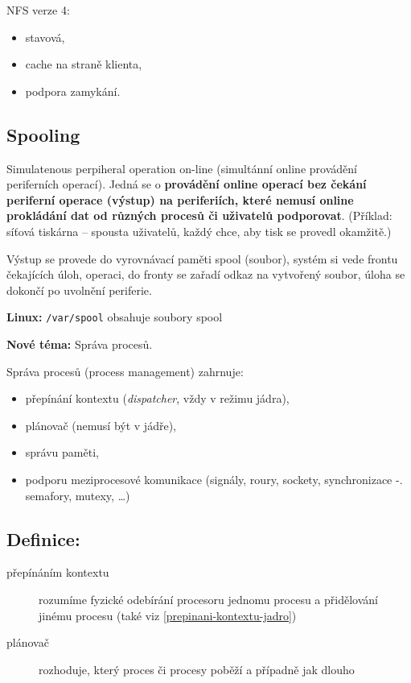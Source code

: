 \documentclass[a4paper, 11pt]{article}
\newcommand{\lpath}[1]{\texttt{#1}}
\begin{document}
NFS verze 4:
\begin{itemize}
    \item stavová,
    \item cache na straně klienta,
    \item podpora zamykání.
\end{itemize}

\subsection{Spooling}
Simulatenous perpiheral operation on-line (simultánní online provádění periferních operací). Jedná se o \textbf{provádění online operací bez čekání periferní operace (výstup) na periferiích, které nemusí online prokládání dat od různých procesů či uživatelů podporovat}. (Příklad: síťová tiskárna -- spousta uživatelů, každý chce, aby tisk se provedl okamžitě.)
 
Výstup se provede do vyrovnávací paměti spool (soubor), systém si vede frontu čekajících úloh, operaci, do fronty se zařadí odkaz na vytvořený soubor, úloha se dokončí po uvolnění periferie.
 
\textbf{Linux:}
\lpath{/var/spool} obsahuje soubory spool
 
\newpage
\textbf{Nové téma:} Správa procesů.
 
Správa procesů (process management) zahrnuje: \label{procesy-detailed}
\begin{itemize}
    \item přepínání kontextu (\emph{dispatcher}, vždy v režimu jádra),
    \item plánovač (nemusí být v jádře),
    \item správu paměti,
    \item podporu meziprocesové komunikace (signály, roury, sockety, synchronizace -. semafory, mutexy, \ldots)
\end{itemize}
 
\subsection*{Definice:}
\begin{description}
\item[přepínáním kontextu] rozumíme fyzické odebírání procesoru jednomu procesu a přidělování jinému procesu (také viz \ref{prepinani-kontextu-jadro})

\item[plánovač] rozhoduje, který proces či procesy poběží a případně jak dlouho
\end{description}
\end{document}
